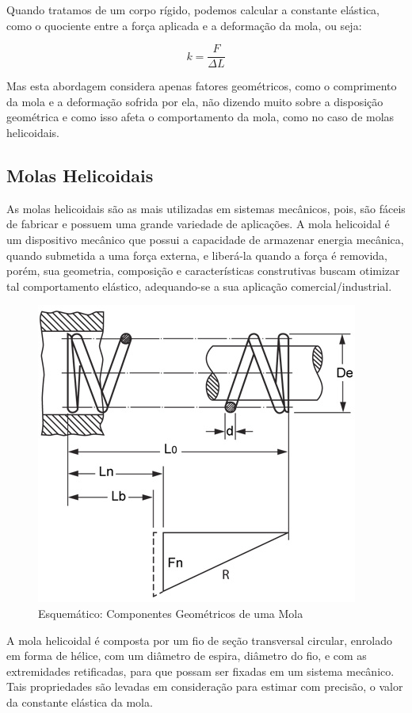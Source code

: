 Quando tratamos de um corpo rígido, podemos calcular a constante elástica, como o quociente entre a força aplicada e a deformação da mola, ou seja:

\begin{equation}
    k = \frac{F}{\Delta L}
\end{equation}

Mas esta abordagem considera apenas fatores geométricos, como o comprimento da mola e a deformação sofrida por ela, não dizendo muito sobre a disposição geométrica e como isso afeta o comportamento da mola, como no caso de molas helicoidais.

\subsection{Molas Helicoidais}
As molas helicoidais são as mais utilizadas em sistemas mecânicos, pois, são fáceis de fabricar e possuem uma grande variedade de aplicações.
A mola helicoidal é um dispositivo mecânico que possui a capacidade de armazenar energia mecânica, quando submetida a uma força externa, e liberá-la quando a força é removida, porém, sua geometria, composição e características construtivas buscam otimizar tal comportamento elástico, adequando-se a sua aplicação comercial/industrial.

\begin{figure}[h]
	\centering
	\includegraphics[width=0.7\linewidth]{"pics/geometria da mola"}
	\caption{Esquemático: Componentes Geométricos de uma Mola}
	\label{fig:geometria-da-mola}
\end{figure}



A mola helicoidal é composta por um fio de seção transversal circular, enrolado em forma de hélice, com um diâmetro de espira, diâmetro do fio, e com as extremidades retificadas, para que possam ser fixadas em um sistema mecânico.
Tais propriedades são levadas em consideração para estimar com precisão, o valor da constante elástica da mola.


